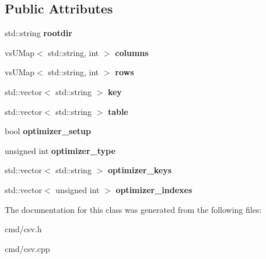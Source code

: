 \subsection*{Public Attributes}
\begin{DoxyCompactItemize}
\item 
std\+::string {\bfseries rootdir}\hypertarget{classCSVTable_a3c455681adcb5ca6aacda48ab4b9e722}{}\label{classCSVTable_a3c455681adcb5ca6aacda48ab4b9e722}

\item 
vs\+U\+Map$<$ std\+::string, int $>$ {\bfseries columns}\hypertarget{classCSVTable_a80b11b55d41b6b87cd39741c1f905132}{}\label{classCSVTable_a80b11b55d41b6b87cd39741c1f905132}

\item 
vs\+U\+Map$<$ std\+::string, int $>$ {\bfseries rows}\hypertarget{classCSVTable_a1aeb093c68bac10e2ce035f08cb454c5}{}\label{classCSVTable_a1aeb093c68bac10e2ce035f08cb454c5}

\item 
std\+::vector$<$ std\+::string $>$ {\bfseries key}\hypertarget{classCSVTable_ac2dbe9738c37434907d5f48b0bd69cf0}{}\label{classCSVTable_ac2dbe9738c37434907d5f48b0bd69cf0}

\item 
std\+::vector$<$ std\+::string $>$ {\bfseries table}\hypertarget{classCSVTable_af7bb9a2805ecbfa3f8e5ea64cebc7fca}{}\label{classCSVTable_af7bb9a2805ecbfa3f8e5ea64cebc7fca}

\item 
bool {\bfseries optimizer\+\_\+setup}\hypertarget{classCSVTable_aee41a97bee04a6f9f8e66e1088878a2d}{}\label{classCSVTable_aee41a97bee04a6f9f8e66e1088878a2d}

\item 
unsigned int {\bfseries optimizer\+\_\+type}\hypertarget{classCSVTable_adab94bd294edc7407708db12dc7aed15}{}\label{classCSVTable_adab94bd294edc7407708db12dc7aed15}

\item 
std\+::vector$<$ std\+::string $>$ {\bfseries optimizer\+\_\+keys}\hypertarget{classCSVTable_a87e4917e91fbbe24461bf5834d1b0398}{}\label{classCSVTable_a87e4917e91fbbe24461bf5834d1b0398}

\item 
std\+::vector$<$ unsigned int $>$ {\bfseries optimizer\+\_\+indexes}\hypertarget{classCSVTable_a4c892eeb3a1391a7d7180c8095b3c210}{}\label{classCSVTable_a4c892eeb3a1391a7d7180c8095b3c210}

\end{DoxyCompactItemize}


The documentation for this class was generated from the following files\+:\begin{DoxyCompactItemize}
\item 
cmd/csv.\+h\item 
cmd/csv.\+cpp\end{DoxyCompactItemize}
